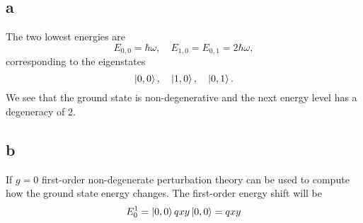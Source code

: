 \documentclass[11pt]{amsart}
\begin{document}
\subsection*{a}
The two lowest energies are
\begin{equation*}
E_{0,0} = \hbar\omega, \quad E_{1,0}=E_{0,1} = 2\hbar\omega,
\end{equation*}
corresponding to the eigenstates
\begin{equation*}
\ket{0,0}, \quad \ket{1,0}, \quad \ket{0,1}.
\end{equation*}
We see that the ground state is non-degenerative and the next energy level has a degeneracy of 2.

\subsection*{b}
If $g=0$ first-order non-degenerate perturbation theory can be used to compute how the ground state energy changes. The first-order energy shift will be
\begin{equation*}
E_0^1 = \ket{0,0}qxy\ket{0,0} = qxy
\end{equation*}
\end{document}
